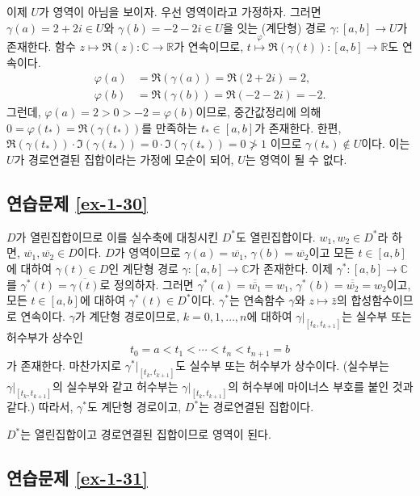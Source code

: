 이제 $U$가 영역이 아님을 보이자.
우선 영역이라고 가정하자.
그러면 
$\gamma(a) = 2+2i\in U$와  $\gamma(b) = -2-2i\in U$을 잇는 
(계단형) 경로 $\gamma: [a,b] \to U$가 존재한다.
함수 $z\mapsto  \Re(z): \mathbb C \to \mathbb R$가 연속이므로,
$t\stackrel{\varphi}{\mapsto} \Re(\gamma(t)): [a,b] \to \mathbb R$도 연속이다.
\begin{align*}
\varphi(a) &= \Re(\gamma(a)) = \Re(2+2i) = 2,\\
\varphi(b) &= \Re(\gamma(b)) = \Re(-2-2i) = -2.
\end{align*}
그런데, $\varphi(a) = 2 >0>-2=\varphi(b)$이므로,
중간값정리에 의해 $0=\varphi(t_*) = \Re(\gamma(t_*))$를 만족하는
$t_*\in [a,b]$가 존재한다. 
한편, $\Re(\gamma(t_*))\cdot \Im(\gamma(t_*)) = 0 \cdot\Im(\gamma(t_*)) =0\not>1$
이므로 $\gamma(t_*) \not\in U$이다.
이는 $U$가 경로연결된 집합이라는 가정에 모순이 되어, $U$는 영역이 될 수 없다.

\subsection*{연습문제 \ref{ex-1-30}}

$D$가 열린집합이므로 이를 실수축에 대칭시킨 $D^*$도 열린집합이다.
$w_1, w_2 \in D^*$라 하면,
$\overline{w_1}, \overline{w_2} \in D$이다.
$D$가 영역이므로 
$\gamma(a) = \overline{w_1}$, $\gamma(b) = \overline{w_2}$이고
모든 $ t\in[a,b]$에 대하여 $\gamma(t)\in D$인
계단형 경로 $\gamma:[a,b] \to \mathbb C$가 존재한다.
이제 $\gamma^*:[a,b] \to \mathbb C$를 $\gamma^*(t) = \overline{\gamma(t)}$로
정의하자. 
그러면 $\gamma^*(a) = \overline{\overline{w_1}}=w_1$,
$\gamma^*(b) = \overline{\overline{w_2}}=w_2$이고,
모든 $t\in[a,b]$에 대하여 $\gamma^*(t)\in D^*$이다.
$\gamma^*$는 연속함수 $\gamma$와 $z\mapsto \bar z$의 합성함수이므로
연속이다.
$\gamma$가 계단형 경로이므로, 
$k=0,1,\ldots, n$에 대하여 $\gamma\big|_{[t_k, t_{k+1}]}$는
실수부 또는 허수부가 상수인
\[
t_0 =a <t_1 < \cdots < t_n  < t_{n+1} = b
\]
가 존재한다.
마찬가지로 $\gamma^*\big|_{[t_k, t_{k+1}]}$도 
실수부 또는 허수부가 상수이다.
(실수부는 $\gamma\big|_{[t_k, t_{k+1}]}$의 실수부와 같고
허수부는 $\gamma\big|_{[t_k, t_{k+1}]}$의 허수부에 마이너스 부호를 
붙인 것과 같다.)
따라서, $\gamma^*$도 계단형 경로이고,
$D^*$는 경로연결된 집합이다.

$D^*$는 열린집합이고 경로연결된 집합이므로 영역이 된다.

\subsection*{연습문제 \ref{ex-1-31}}

